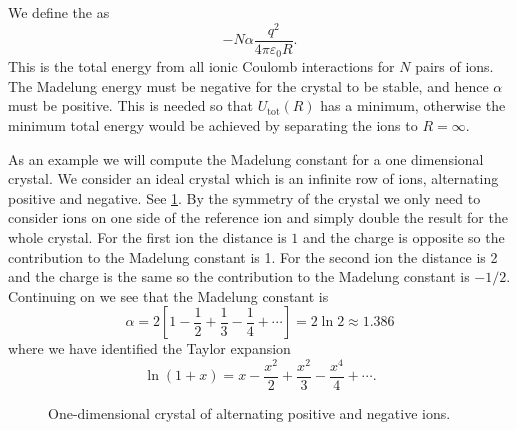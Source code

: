 \documentclass[fleqn]{NotesClass}
\newcommand*{\tot}{\mathrm{tot}}
\begin{document}
    We define the  as
    \begin{equation}
        -N\alpha\frac{q^2}{4\pi\varepsilon_0R}.
    \end{equation}
    This is the total energy from all ionic Coulomb interactions for \(N\) pairs of ions.
    The Madelung energy must be negative for the crystal to be stable, and hence \(\alpha\) must be positive.
    This is needed so that \(U_{\tot}(R)\) has a minimum, otherwise the minimum total energy would be achieved by separating the ions to \(R = \infty\).
    
    As an example we will compute the Madelung constant for a one dimensional crystal.
    We consider an ideal crystal which is an infinite row of ions, alternating positive and negative.
    See \cref{fig:1d ionic crystal}.
    By the symmetry of the crystal we only need to consider ions on one side of the reference ion and simply double the result for the whole crystal.
    For the first ion the distance is \(1\) and the charge is opposite so the contribution to the Madelung constant is 1.
    For the second ion the distance is 2 and the charge is the same so the contribution to the Madelung constant is \(-1/2\).
    Continuing on we see that the Madelung constant is
    \begin{equation}
        \alpha = 2\left[ 1 - \frac{1}{2} + \frac{1}{3} - \frac{1}{4} + \dotsb \right] = 2\ln 2 \approx 1.386
    \end{equation}
    where we have identified the Taylor expansion
    \begin{equation}
        \ln(1 + x) = x - \frac{x^2}{2} + \frac{x^2}{3} - \frac{x^4}{4} + \dotsb.
    \end{equation}
    
    \begin{figure}
        \caption{One-dimensional crystal of alternating positive and negative ions.}
        \label{fig:1d ionic crystal}
    \end{figure}
    
\end{document}
